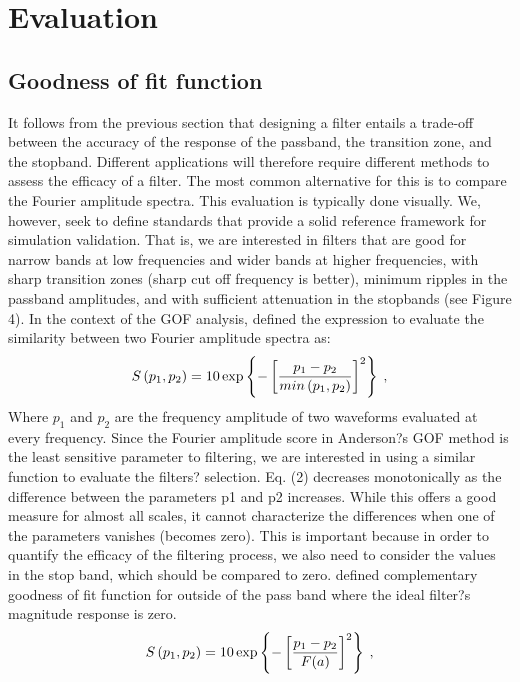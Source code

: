 
\section{Evaluation}

\subsection{Goodness of fit function}

It follows from the previous section that designing a filter entails a trade-off between the accuracy of the response of the passband, the transition zone, and the stopband. Different applications will therefore require different methods to assess the efficacy of a filter. The most common alternative for this is to compare the Fourier amplitude spectra. This  evaluation is typically done visually. We, however, seek to define standards that provide a solid reference framework for simulation validation. That is, we are interested in filters that are good for narrow bands at low frequencies and wider bands at higher frequencies, with sharp transition zones (sharp cut off frequency is better), minimum ripples in the passband amplitudes, and with sufficient attenuation in the stopbands (see Figure 4). In the context of the GOF analysis, \citet{Anderson_2004} defined the expression to evaluate the similarity between two Fourier amplitude spectra as:
% 
\begin{equation}
    \label{eq:s}
	S \left( p_1,p_2 \right) = 10 \exp \left\{ -\left[ \frac{p_1-p_2}{min \left(p_1,p_2\right)} \right]^2 \right\} 
    \hspace{0.25em},
\end{equation}
% 
Where $p_1$ and $p_2$ are the frequency amplitude of two waveforms evaluated at every frequency. Since the Fourier amplitude score in Anderson?s GOF method is the least sensitive parameter to filtering, we are interested in using a similar function to evaluate the filters? selection. Eq. (2) decreases monotonically as the difference between the parameters p1 and p2 increases. While this offers a good measure for almost all scales, it cannot characterize the differences when one of the parameters vanishes (becomes zero). This is important because in order to quantify the efficacy of the filtering process, we also need to consider the values in the stop band, which should be compared to zero. \citet{Khoshenvis_2015} defined complementary goodness of fit function for outside of the pass band where the ideal filter?s magnitude response is zero. 
% 
\begin{equation} 
    \label{eq:s-modified}
    S \left( p_1,p_2 \right) = 10 \exp \left\{ -\left[ \frac{p_1 - p_2}{F(a)} \right]^2 \right\} 
    \hspace{0.25em},
\end{equation}
